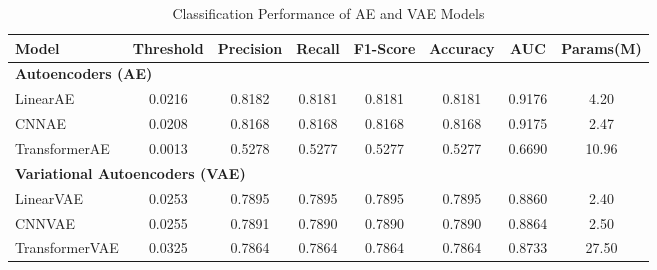 \documentclass[12pt]{article}
\begin{document}
\begin{table}[htbp]
    \centering
    \caption{Classification Performance of AE and VAE Models}
    \vspace{5pt}
    \label{tab:model_performance}
    \begin{adjustbox}{width=\textwidth}
        \begin{tabular}{lccccccc}
            \toprule
            \textbf{Model} & \textbf{Threshold} & \textbf{Precision} & \textbf{Recall} & \textbf{F1-Score} & \textbf{Accuracy} & \textbf{AUC} & \textbf{Params(M)} \\
            \midrule

            \multicolumn{8}{l}{\textbf{Autoencoders (AE)}}                                                                                                         \\
            \midrule
            LinearAE       & 0.0216             & 0.8182             & 0.8181          & 0.8181            & 0.8181            & 0.9176       & 4.20               \\
            CNNAE          & 0.0208             & 0.8168             & 0.8168          & 0.8168            & 0.8168            & 0.9175       & 2.47               \\
            TransformerAE  & 0.0013             & 0.5278             & 0.5277          & 0.5277            & 0.5277            & 0.6690       & 10.96              \\

            \midrule
            \multicolumn{8}{l}{\textbf{Variational Autoencoders (VAE)}}                                                                                            \\
            \midrule
            LinearVAE      & 0.0253             & 0.7895             & 0.7895          & 0.7895            & 0.7895            & 0.8860       & 2.40               \\
            CNNVAE         & 0.0255             & 0.7891             & 0.7890          & 0.7890            & 0.7890            & 0.8864       & 2.50               \\
            TransformerVAE & 0.0325             & 0.7864             & 0.7864          & 0.7864            & 0.7864            & 0.8733       & 27.50              \\

            \bottomrule
        \end{tabular}
    \end{adjustbox}

\end{table}
\end{document}
